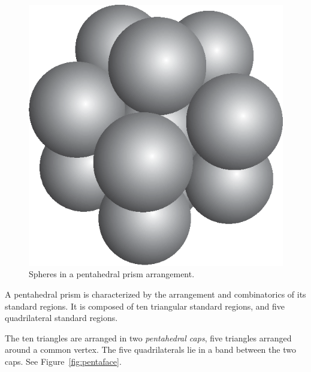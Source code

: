 \begin{figure}
\begin{center}
\includegraphics{PS/pentaballs}
\end{center}
\caption{Spheres in a pentahedral prism arrangement.}
\label{fig:penta2}
\end{figure}

A pentahedral prism is characterized by the arrangement and
combinatorics of its standard regions.  It is composed of ten triangular
standard regions, and five quadrilateral standard regions.

The ten triangles are arranged in two
{\em pentahedral caps}, five triangles arranged around a common vertex.
The five quadrilaterals lie in a band between the two caps.
See Figure~\ref{fig:pentaface}.

